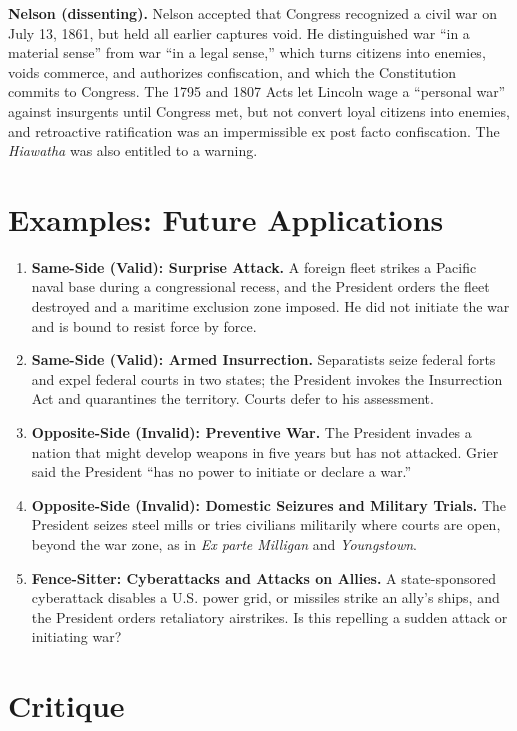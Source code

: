 \documentclass[12pt]{article}
\begin{document}
\textbf{Nelson (dissenting).} Nelson accepted that Congress recognized a civil war on July 13, 1861, but held all earlier captures void. He distinguished war ``in a material sense'' from war ``in a legal sense,'' which turns citizens into enemies, voids commerce, and authorizes confiscation, and which the Constitution commits to Congress. The 1795 and 1807 Acts let Lincoln wage a ``personal war'' against insurgents until Congress met, but not convert loyal citizens into enemies, and retroactive ratification was an impermissible ex post facto confiscation. The \textit{Hiawatha} was also entitled to a warning.

\section{Examples: Future Applications}

\begin{enumerate}
\item \textbf{Same-Side (Valid): Surprise Attack.} A foreign fleet strikes a Pacific naval base during a congressional recess, and the President orders the fleet destroyed and a maritime exclusion zone imposed. He did not initiate the war and is bound to resist force by force.
\item \textbf{Same-Side (Valid): Armed Insurrection.} Separatists seize federal forts and expel federal courts in two states; the President invokes the Insurrection Act and quarantines the territory. Courts defer to his assessment.
\item \textbf{Opposite-Side (Invalid): Preventive War.} The President invades a nation that might develop weapons in five years but has not attacked. Grier said the President ``has no power to initiate or declare a war.''
\item \textbf{Opposite-Side (Invalid): Domestic Seizures and Military Trials.} The President seizes steel mills or tries civilians militarily where courts are open, beyond the war zone, as in \textit{Ex parte Milligan} and \textit{Youngstown}.
\item \textbf{Fence-Sitter: Cyberattacks and Attacks on Allies.} A state-sponsored cyberattack disables a U.S. power grid, or missiles strike an ally's ships, and the President orders retaliatory airstrikes. Is this repelling a sudden attack or initiating war?
\end{enumerate}

\section{Critique}
\end{document}
